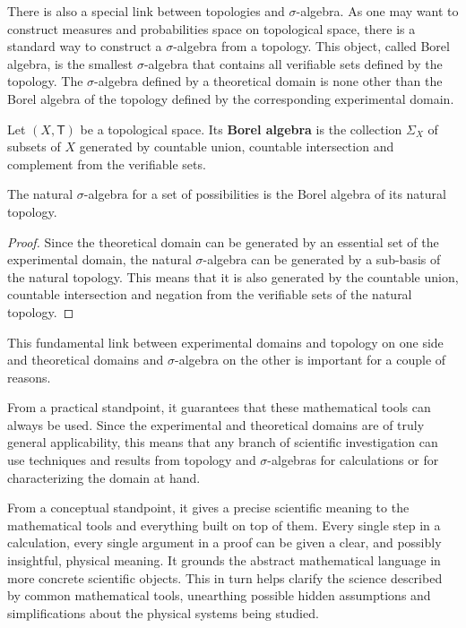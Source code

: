 \documentclass[11pt,letterpaper,fleqn]{memoir} %
\begin{document}
There is also a special link between topologies and $\sigma$-algebra. As one may want to construct measures and probabilities space on topological space, there is a standard way to construct a $\sigma$-algebra from a topology. This object, called Borel algebra, is the smallest $\sigma$-algebra that contains all verifiable sets defined by the topology. The $\sigma$-algebra defined by a theoretical domain is none other than the Borel algebra of the topology defined by the corresponding experimental domain.

\begin{mathSection}
	
	\begin{defn}
		Let $(X, \mathsf{T})$ be a topological space. Its \textbf{Borel algebra} is the collection $\Sigma_X$ of subsets of $X$ generated by countable union, countable intersection and complement from the verifiable sets.
	\end{defn}
	
	\begin{prop}
		The natural $\sigma$-algebra for a set of possibilities is the Borel algebra of its natural topology.
	\end{prop}
	
	\begin{proof}
		Since the theoretical domain can be generated by an essential set of the experimental domain, the natural $\sigma$-algebra can be generated by a sub-basis of the natural topology. This means that it is also generated by the countable union, countable intersection and negation from the verifiable sets of the natural topology.
	\end{proof}
\end{mathSection}

This fundamental link between experimental domains and topology on one side and theoretical domains and $\sigma$-algebra on the other is important for a couple of reasons.

From a practical standpoint, it guarantees that these mathematical tools can always be used. Since the experimental and theoretical domains are of truly general applicability, this means that any branch of scientific investigation can use techniques and results from topology and $\sigma$-algebras for calculations or for characterizing the domain at hand.

From a conceptual standpoint, it gives a precise scientific meaning to the mathematical tools and everything built on top of them. Every single step in a calculation, every single argument in a proof can be given a clear, and possibly insightful, physical meaning. It grounds the abstract mathematical language in more concrete scientific objects. This in turn helps clarify the science described by common mathematical tools, unearthing possible hidden assumptions and simplifications about the physical systems being studied.
\end{document}
